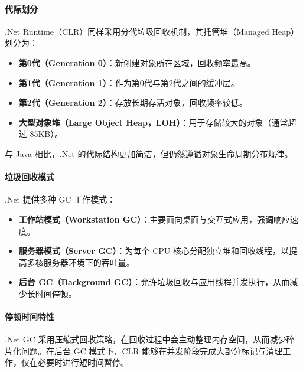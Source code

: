 \paragraph{代际划分}

.Net Runtime（CLR）同样采用分代垃圾回收机制，其托管堆（Managed Heap）划分为：

\begin{itemize}
    \item \textbf{第0代（Generation 0）}：新创建对象所在区域，回收频率最高。
    
    \item \textbf{第1代（Generation 1）}：作为第0代与第2代之间的缓冲层。
    
    \item \textbf{第2代（Generation 2）}：存放长期存活对象，回收频率较低。
    
    \item \textbf{大型对象堆（Large Object Heap，LOH）}：用于存储较大的对象（通常超过 85KB）。
\end{itemize}

与 Java 相比，.Net 的代际结构更加简洁，但仍然遵循对象生命周期分布规律。

\paragraph{垃圾回收模式}

.Net 提供多种 GC 工作模式：

\begin{itemize}
    \item \textbf{工作站模式（Workstation GC）}：主要面向桌面与交互式应用，强调响应速度。
    
    \item \textbf{服务器模式（Server GC）}：为每个 CPU 核心分配独立堆和回收线程，以提高多核服务器环境下的吞吐量。
    
    \item \textbf{后台 GC（Background GC）}：允许垃圾回收与应用线程并发执行，从而减少长时间停顿。
\end{itemize}

\paragraph{停顿时间特性}

.Net GC 采用压缩式回收策略，在回收过程中会主动整理内存空间，从而减少碎片化问题。在后台 GC 模式下，CLR 能够在并发阶段完成大部分标记与清理工作，仅在必要时进行短时间暂停。

